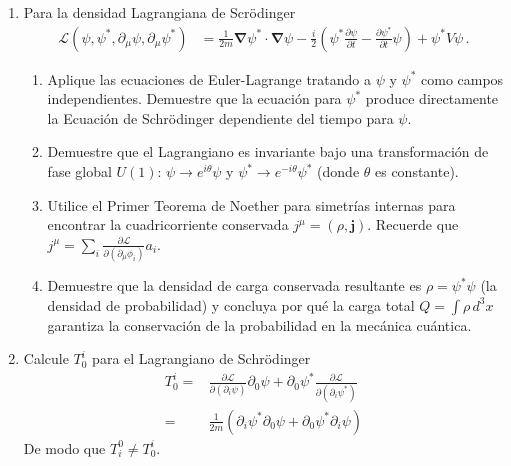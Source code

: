 \begin{enumerate}
\begin{enumerate}
        \item Finalmente, proponga un reescalamiento constante de los campos de la forma $\phi'_1 = \alpha \tilde{\phi}_1$ y $\phi'_2 = \beta \tilde{\phi}_2$ para absorber los autovalores y llevar el Lagrangiano a su forma canónica definitiva:
        \begin{equation*}
            \mathcal{L} = \frac{1}{2}\partial_\mu \phi'_1 \partial^\mu \phi'_1 + \frac{1}{2}\partial_\mu \phi'_2 \partial^\mu \phi'_2
        \end{equation*}
    \end{enumerate}


\item Para la densidad Lagrangiana de Scrödinger
    \begin{align}
      \mathcal{L}(\psi,\psi^*,\partial_\mu\psi,\partial_\mu\psi^*)
&=\frac{1}{2m}\boldsymbol{\nabla}\psi^*\cdot\boldsymbol{\nabla}\psi-\frac{i}{2}
  \left(
\psi^*\frac{\partial\psi}{\partial t}-\frac{\partial\psi^*}{\partial t}\psi
  \right)+\psi^*V\psi\,.
  \end{align}

    \begin{enumerate}
        \item Aplique las ecuaciones de Euler-Lagrange tratando a $\psi$ y $\psi^*$ como campos independientes. Demuestre que la ecuación para $\psi^*$ produce directamente la Ecuación de Schrödinger dependiente del tiempo para $\psi$.
        \item Demuestre que el Lagrangiano es invariante bajo una transformación de fase global $U(1)$: $\psi \to e^{i\theta}\psi$ y $\psi^* \to e^{-i\theta}\psi^*$ (donde $\theta$ es constante).
        \item Utilice el Primer Teorema de Noether para simetrías internas para encontrar la cuadricorriente conservada $j^\mu = (\rho, \mathbf{j})$. Recuerde que $j^\mu = \sum_i \frac{\partial \mathcal{L}}{\partial(\partial_\mu\phi_i)} a_i$.
        \item Demuestre que la densidad de carga conservada resultante es $\rho = \psi^*\psi$ (la densidad de probabilidad) y concluya por qué la carga total $Q = \int \rho \, d^3x$ garantiza la conservación de la probabilidad en la mecánica cuántica.
    \end{enumerate}

  
\item Calcule $T^i_0$ para el Lagrangiano de Schr\"odinger
  \begin{align}
    T^i_0=&\frac{\partial\mathcal{L}}{\partial(\partial_i \psi)}\partial_0\psi+\partial_0\psi^*\frac{\partial\mathcal{L}}{\partial(\partial_i \psi^*)}\nonumber\\
    =&\frac{1}{2m}\left(\partial_i\psi^*\partial_0\psi+\partial_0\psi^*\partial_i\psi \right)
  \end{align}
De modo que $T^0_i\neq T^i_0$.



\end{enumerate}
